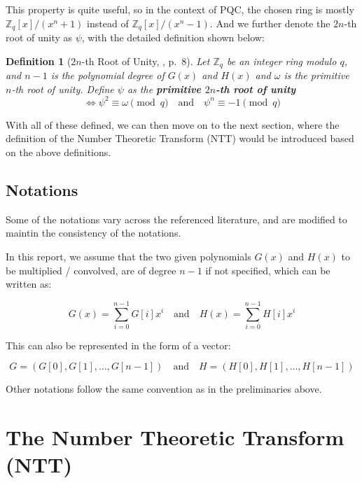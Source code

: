 \documentclass[12pt]{article}
\newtheorem{definition}{Definition}[section]
\begin{document}
This property is quite useful, so in the context of PQC, 
the chosen ring is mostly $\mathbb{Z}_q[x] / (x^n + 1)$ instead of $\mathbb{Z}_q[x] / (x^n - 1)$.
\cite[p.~8]{beginner_guide} 
And we further denote the $2n$-th root of unity as $\psi$, 
with the detailed definition shown below:

\begin{definition}[$2n$-th Root of Unity, \cite{beginner_guide}, p.~8]
    Let $\mathbb{Z}_q$ be an integer ring modulo $q$, and $n - 1$ is the polynomial degree of $G(x)$ and $H(x)$
    and $\omega$ is the primitive $n$-th root of unity. 
    Define $\psi$ as the \textbf{primitive $2n$-th root of unity} 
    \begin{equation*}
        \iff \psi^2 \equiv \omega \pmod{q} \quad \text{and} \quad \psi^n \equiv -1 \pmod{q}
    \end{equation*}
\end{definition}

With all of these defined, we can then move on to the next section, 
where the definition of the Number Theoretic Transform (NTT) would be introduced based on the above definitions.

\subsection{Notations}

Some of the notations vary across the referenced literature, 
and are modified to maintin the consistency of the notations. 

In this report, we assume that the two given polynomials $G(x)$ and $H(x)$ to be multiplied / convolved, 
are of degree $n-1$ if not specified, which can be written as:

\begin{equation*}
    G(x) = \sum_{i = 0}^{n - 1} G[i] x^i \quad \text{and} \quad H(x) = \sum_{i = 0}^{n - 1} H[i] x^i
\end{equation*}

This can also be represented in the form of a vector:

\begin{equation*}
    G = (G[0], G[1], \ldots, G[n - 1]) \quad \text{and} \quad H = (H[0], H[1], \ldots, H[n - 1])
\end{equation*}

Other notations follow the same convention as in the preliminaries above.

\section{The Number Theoretic Transform (NTT)}
\end{document}

